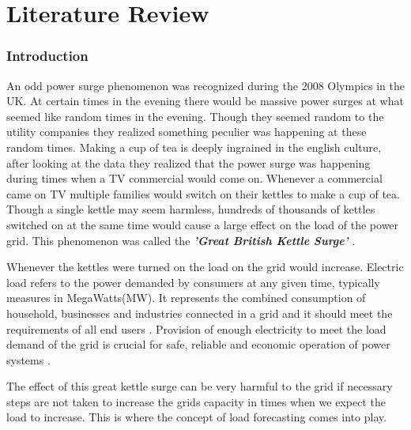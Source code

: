 

\chapter{Literature Review \label{litReview}}
\subsection{Introduction}
An odd power surge phenomenon was recognized during the 2008 Olympics in the UK. At certain times in  the evening there would be massive power surges at what seemed like random times in the evening. Though they seemed random to the utility companies they realized something  peculier was happening at these random times. Making a cup of tea is deeply ingrained in the english culture, after looking at the data they realized that the power surge was happening during times when a TV commercial would come on. Whenever a commercial came on TV multiple families would switch on their kettles to make a cup of tea. Though a single kettle may seem harmless, hundreds of thousands of kettles switched on at the same time would cause a large effect on the load of the power grid. This phenomenon was called the \textbf{\textit{'Great British Kettle Surge'}} \cite{kettle_surge}.

Whenever the kettles were turned on the load on the grid would increase. Electric load refers to the power demanded by consumers at any given time, typically measures in MegaWatts(MW). It represents the combined consumption of household, businesses and industries connected in a grid and it should meet the requirements of all end users  \cite{dong2021short}. Provision of enough electricity to meet the load demand of the grid is crucial for safe, reliable and economic operation of power systems \cite{dong2021short}.

The effect of this great kettle surge can be very harmful to the grid if necessary steps are not taken to increase the grids capacity in times when we expect the load to increase. This is where the concept of load forecasting comes into play.

